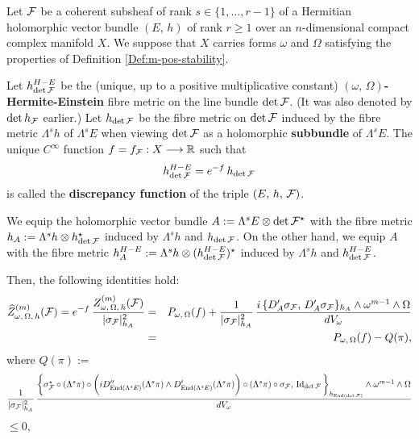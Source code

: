 \documentclass[12pt]{article}
\begin{document}
\begin{The-Def}\label{The-Def:discrepancy-equation} Let ${\cal F}$ be a coherent subsheaf of rank $s\in\{1,\dots , r-1\}$ of a Hermitian holomorphic vector bundle $(E,\,h)$ of rank $r\geq 1$ over an $n$-dimensional compact complex manifold $X$. We suppose that $X$ carries forms $\omega$ and $\Omega$ satisfying the properties of Definition \ref{Def:m-pos-stability}.

  Let $h_{\det{\cal F}}^{H-E}$ be the (unique, up to a positive multiplicative constant) {\bf $(\omega,\,\Omega)$-Hermite-Einstein} fibre metric on the line bundle $\det{\cal F}$. (It was also denoted by $\det h_{{\cal F}}$ earlier.) Let $h_{\det{\cal F}}$ be the fibre metric on $\det{\cal F}$ induced by the fibre metric $\Lambda^sh$ of $\Lambda^sE$ when viewing $\det{\cal F}$ as a holomorphic {\bf subbundle} of $\Lambda^sE$. The unique $C^\infty$ function $f = f_{\cal F}:X\longrightarrow\mathbb{R}$ such that \begin{eqnarray}\label{eqn:discrepancy-fucntion_def}h_{\det{\cal F}}^{H-E} = e^{-f}\,h_{\det{\cal F}}\end{eqnarray} is called the {\bf discrepancy function} of the triple $(E,\,h,\,{\cal F})$.

  We equip the holomorphic vector bundle $A:=\Lambda^sE\otimes\det{\cal F}^\star$ with the fibre metric $h_A:=\Lambda^sh\otimes h_{\det\cal F}^\star$ induced by $\Lambda^sh$ and $h_{\det\cal F}$. On the other hand, we equip $A$ with the fibre metric $h_A^{H-E}:=\Lambda^sh\otimes (h_{\det\cal F}^{H-E})^\star$ induced by $\Lambda^sh$ and $h_{\det\cal F}^{H-E}$.

\vspace{1ex}

Then, the following identities hold: \begin{eqnarray}\label{eqn:discrepancy-equation_1}\widehat{Z}_{\omega,\,\Omega,\,h}^{(m)}({\cal F}) = e^{-f}\,\frac{Z_{\omega,\,\Omega,\,h}^{(m)}({\cal F})}{|\sigma_{{\cal F}}|^2_{h_A}} & = & P_{\omega,\,\Omega}(f) + \frac{1}{|\sigma_{{\cal F}}|^2_{h_A}}\,\frac{i\,\{D'_A\sigma_{\cal F},\,D'_A\sigma_{\cal F}\}_{h_A}\wedge\omega^{m-1}\wedge\Omega}{dV_\omega} \\
  \label{eqn:discrepancy-equation_2} & = & P_{\omega,\,\Omega}(f) - Q(\pi),\end{eqnarray} where $Q(\pi):=$ \begin{eqnarray*}\frac{1}{|\sigma_{{\cal F}}|^2_{h_A}}\,\frac{\bigg\{\sigma_{{\cal F}}^\star\circ(\Lambda^s\pi)\circ\bigg(iD''_{\operatorname{End}(\Lambda^sE)}(\Lambda^s\pi)\wedge D'_{\operatorname{End}(\Lambda^sE)}(\Lambda^s\pi)\bigg)\circ(\Lambda^s\pi)\circ\sigma_{{\cal F}},\,\operatorname{Id}_{\det{\cal F}}\bigg\}_{h_{\operatorname{End}({\det\cal F})}}\wedge\omega^{m-1}\wedge\Omega}{dV_\omega}\end{eqnarray*} \hspace{10ex} $\leq 0$,


\end{The-Def}
\end{document}
